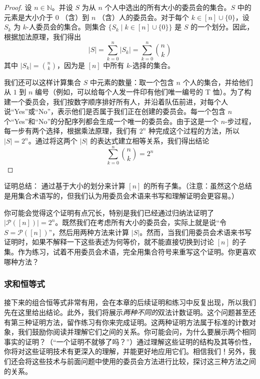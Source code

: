 \begin{proof}
    设 $n \in \mathbb{N}$。并设 $S$ 为从 $n$ 个人中选出的所有大小的委员会的集合。$S$ 中的元素是大小介于 $0$ （含）到 $n$ （含）人的委员会。对于每个 $k \in [n] \cup \{0\}$，设 $S_k$ 为 $k$-人委员会的集合。则集合 $\{S_k \mid k \in [n] \cup \{0\}\}$ 是 $S$ 的一个划分。因此，根据加法原理，我们得出
    \[|S| = \sum_{k=0}^{n} |S_k| = \sum_{k=0}^{n} {n \choose k} \]
    其中 $|S_k| = {n \choose k}$，因为是 $[n]$ 中所有 $k$-选择的集合。

    我们还可以这样计算集合 $S$ 中元素的数量：取一个包含 $n$ 个人的集合，并给他们从 $1$ 到 $n$ 编号（例如，可以给每个人发一件印有他们唯一编号的 T 恤）。为了构建一个委员会，我们按数字顺序排好所有人，并沿着队伍前进，对每个人说``Yes''或``No''，表示他们是否属于我们正在创建的委员会。每一个包含 $n$ 个``Yes''和``No''的分配序列都会生成一个唯一的委员会。由于这是一个 $n$-步过程，每一步有两个选择，根据乘法原理，我们有 $2^n$ 种完成这个过程的方法，所以 $|S| = 2^n$。通过将这两个 $|S|$ 的表达式建立相等关系，我们得出结论
    \[\sum_{k=0}^{n} {n \choose k}=2^n\]
\end{proof}

\begin{questions}{证明总结：}
    通过基于大小的划分来计算 $[n]$ 的所有子集。（注意：虽然这个总结是用集合术语写的，但我们认为用委员会术语来书写和理解证明会更容易。）
\end{questions}

你可能会觉得这个证明有点冗长，特别是我们已经通过归纳法证明了 $|\mathcal{P}([n])| = 2^n$。既然我们在考虑所有大小的委员会，实际上就是说``令 $S = \mathcal{P}([n])$''，然后用两种方法来计算 $|S|$。然而，当我们用委员会术语来书写证明时，如果不解释一下这些表述为何等价，就不能直接切换到讨论 $[n]$ 的子集。作为练习，试着不用委员会术语，完全用集合符号来重写这个证明。你更喜欢哪种方法？

\subsubsection*{求和恒等式}

接下来的组合恒等式非常有用，会在本章的后续证明和练习中反复出现，所以我们先在这里给出结论。此外，我们将展示\emph{两种不同的}双法计数证明。这个问题甚至还有第三种证明方法，留作练习有你来完成证明。这两种证明方法属于标准的计数对象，我们鼓励你阅读并理解它们之间的关系。你可能会问，为什么要展示两个相同事实的证明？（``一个证明不就够了吗？''）通过理解这些证明的结构及其等价性，你将对这些证明技术有更深入的理解，并能更好地应用它们。相信我们！另外，我们还会将这些技术与前面问题中使用的委员会方法进行比较，探讨这三种方法之间的关系。

